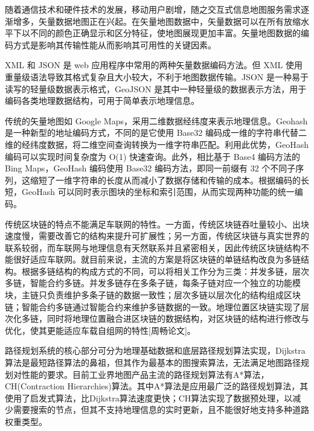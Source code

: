 随着通信技术和硬件技术的发展，移动用户剧增，随之交互式信息地图服务需求逐渐增多，矢量数据地图正在兴起。在矢量地图数据中，矢量数据可以在所有放缩水平下以不同的颜色正确显示和区分特征，使地图展现更加丰富。矢量地图数据的编码方式是影响其传输性能从而影响其可用性的关键因素。

XML 和 JSON 是 web 应用程序中常用的两种矢量数据编码方法。但 XML 使用重量级语法导致其格式复杂且大小较大，不利于地图数据传输。JSON 是一种易于读写的轻量级数据表示格式，GeoJSON 是其中一种轻量级的数据表示方法，用于编码各类地理数据结构，可用于简单表示地理信息。

传统的矢量地图如 Google Maps，采用二维数据经纬度来表示地理信息。Geohash 是一种新型的地址编码方式，不同的是它使用 Base32 编码成一维的字符串代替二维的经纬度数据，将二维空间查询转换为一维字符串匹配。利用此优势，GeoHash 编码可以实现时间复杂度为 O(1) 快速查询。此外，相比基于 Base4 编码方法的 Bing Maps，GeoHash 编码使用 Base32 编码方法，即同一前缀有 32 个不同子序列，这缩短了一维字符串的长度从而减小了数据存储和传输的成本。根据编码的长短，GeoHash 可以同时表示图块的坐标和索引范围，从而实现两种功能的统一编码。

传统区块链的特点不能满足车联网的特性。一方面，传统区块链吞吐量较小、出块速度慢，需要改善它的结构来提升可扩展性；另一方面，传统区块链与真实世界的联系较弱，而车联网与地理信息有天然联系并且紧密相关，因此传统区块链结构不能很好适应车联网。就目前来说，主流的方案是将区块链的单链结构改良为多链结构。根据多链结构的构成方式的不同，可以将相关工作分为三类：并发多链，层次多链，智能合约多链。并发多链存在多条子链，每条子链对应一个独立的功能模块，主链只负责维护多条子链的数据一致性；层次多链以层次化的结构组成区块链；智能合约多链通过智能合约来维护多链数据的一致。地理位置区块链实现了层次化多链，同时将地理位置融合进区块链的数据结构，对区块链的结构进行修改与优化，使其更能适应车载自组网的特性[周畅论文]。

路径规划系统的核心部分可分为地理基础数据和底层路径规划算法实现，Dijkstra算法是最短路径算法的鼻祖，但其作为最基本的图搜索算法，无法满足地图路径规划对性能的要求。目前工业界地图产品主流的路径规划算法有A*算法，CH(Contraction Hierarchies)算法。其中A*算法是应用最广泛的路径规划算法，其使用了启发式算法，比Dijkstra算法速度更快；CH算法实现了数据预处理，以减少需要搜索的节点，但其不支持地理信息的实时更新，且不能很好地支持多种道路权重类型。

